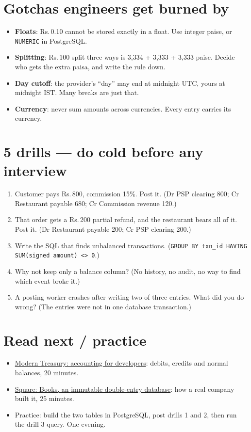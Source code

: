 \documentclass[10pt,a4paper]{article}
\begin{document}
\section{Gotchas engineers get burned by}
\begin{itemize}
  \item \textbf{Floats}: Rs.\,0.10 cannot be stored exactly in a float. Use integer paise, or \texttt{NUMERIC} in PostgreSQL.
  \item \textbf{Splitting}: Rs.\,100 split three ways is 3,334 + 3,333 + 3,333 paise. Decide who gets the extra paisa, and write the rule down.
  \item \textbf{Day cutoff}: the provider's ``day'' may end at midnight UTC, yours at midnight IST. Many breaks are just that.
  \item \textbf{Currency}: never sum amounts across currencies. Every entry carries its currency.
\end{itemize}

\section{5 drills — do cold before any interview}
\begin{enumerate}[leftmargin=1.4em,itemsep=1pt]
  \item Customer pays Rs.\,800, commission 15\%. Post it. (Dr PSP clearing 800; Cr Restaurant payable 680; Cr Commission revenue 120.)
  \item That order gets a Rs.\,200 partial refund, and the restaurant bears all of it. Post it. (Dr Restaurant payable 200; Cr PSP clearing 200.)
  \item Write the SQL that finds unbalanced transactions. (\texttt{GROUP BY txn\_id HAVING SUM(signed amount) <> 0}.)
  \item Why not keep only a balance column? (No history, no audit, no way to find which event broke it.)
  \item A posting worker crashes after writing two of three entries. What did you do wrong? (The entries were not in one database transaction.)
\end{enumerate}

\section{Read next / practice}
\begin{itemize}
  \item \href{https://www.moderntreasury.com/journal/accounting-for-developers-part-i}{Modern Treasury: accounting for developers}: debits, credits and normal balances, 20 minutes.
  \item \href{https://developer.squareup.com/blog/books-an-immutable-double-entry-accounting-database-service/}{Square: Books, an immutable double-entry database}: how a real company built it, 25 minutes.
  \item Practice: build the two tables in PostgreSQL, post drills 1 and 2, then run the drill 3 query. One evening.
\end{itemize}
\end{document}
